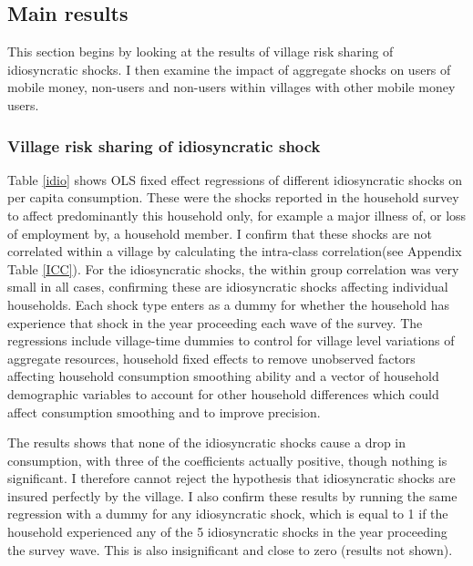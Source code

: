 \subsection{Main results}
This section begins by looking at the results of village risk sharing of idiosyncratic shocks. I then examine the impact of aggregate shocks on users of mobile money, non-users and non-users within villages with other mobile money users.  

\subsubsection{Village risk sharing of idiosyncratic shock}
Table \ref{idio} shows OLS fixed effect regressions of different idiosyncratic shocks on per capita consumption. These were the shocks reported in the household survey to affect predominantly this household only, for example a major illness of, or loss of employment by, a household member. I confirm that these shocks are not correlated within a village by calculating the intra-class correlation(see Appendix Table \ref{ICC}). For the idiosyncratic shocks, the within group correlation was very small in all cases, confirming these are idiosyncratic shocks affecting individual households.     
Each shock type enters as a dummy for whether the household has experience that shock in the year proceeding each wave of the survey. The regressions include village-time dummies to control for village level variations of aggregate resources, household fixed effects to remove unobserved factors affecting household consumption smoothing ability and a vector of household demographic variables to account for other household differences which could affect consumption smoothing and to improve precision. 

The results shows that none of the idiosyncratic shocks cause a drop in consumption, with three of the coefficients actually positive, though nothing is significant. I therefore cannot reject the hypothesis that idiosyncratic shocks are insured perfectly by the village. I also confirm these results by running the same regression with a dummy for any idiosyncratic shock, which is equal to 1 if the household experienced any of the 5 idiosyncratic shocks in the year proceeding the survey wave. This is also insignificant and close to zero (results not shown).  



